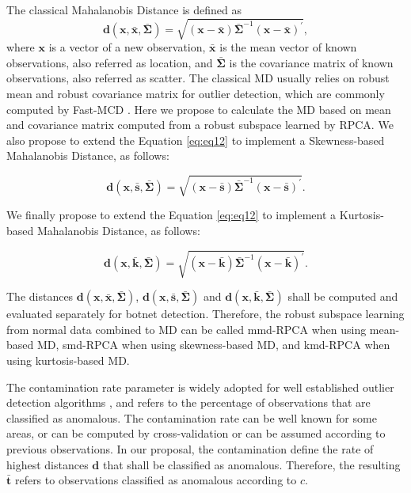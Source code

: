 \documentclass[review]{elsarticle}
\begin{document}
The classical Mahalanobis Distance is defined as		
\begin{equation}\label{eq:eq12}
	\boldsymbol{d}(\boldsymbol{x},\bar{\boldsymbol{x}}, \boldsymbol{\bar{\Sigma}}) = \sqrt{(\boldsymbol{x} - \bar{\boldsymbol{x}}) \boldsymbol{\bar{\Sigma}}^{-1}(\boldsymbol{x} - \bar{\boldsymbol{x}})^\prime},
\end{equation}
where $\boldsymbol{x}$ is a vector of a new observation, $\bar{\boldsymbol{x}}$ is the mean vector of known observations, also referred as location, and $\boldsymbol{\bar{\Sigma}}$ is the covariance matrix of known observations, also referred as scatter. The classical MD usually relies on robust mean and robust covariance matrix for outlier detection, which are commonly computed by Fast-MCD \cite{rousseeuw1984mcd, rousseeuw1999fastmcd}. Here we propose to calculate the MD based on mean and covariance matrix computed from a robust subspace learned by RPCA. We also propose to extend the Equation \ref{eq:eq12} to implement a Skewness-based Mahalanobis Distance, as follows:

\begin{equation}\label{eq:eq13}
	\boldsymbol{d}(\boldsymbol{x}, \bar{\boldsymbol{s}}, \boldsymbol{\bar{\Sigma}}) = \sqrt{(\boldsymbol{x} - \bar{\boldsymbol{s}}) \boldsymbol{\bar{\Sigma}}^{-1}(\boldsymbol{x} - \bar{\boldsymbol{s}})^\prime}.
\end{equation}

We finally propose to extend the Equation \ref{eq:eq12} to implement a Kurtosis-based Mahalanobis Distance, as follows:

\begin{equation}\label{eq:eq14}
	\boldsymbol{d}(\boldsymbol{x}, \bar{\boldsymbol{k}}, \boldsymbol{\bar{\Sigma}}) = \sqrt{(\boldsymbol{x} - \bar{\boldsymbol{k}}) \boldsymbol{\bar{\Sigma}}^{-1}(\boldsymbol{x} - \bar{\boldsymbol{k}})^\prime}.
\end{equation}

The distances $\boldsymbol{d}(\boldsymbol{x},\bar{\boldsymbol{x}}, \boldsymbol{\bar{\Sigma}})$, $\boldsymbol{d}(\boldsymbol{x}, \bar{\boldsymbol{s}}, \boldsymbol{\bar{\Sigma}})$ and $\boldsymbol{d}(\boldsymbol{x}, \bar{\boldsymbol{k}}, \boldsymbol{\bar{\Sigma}})$ shall be computed and evaluated separately for botnet detection. Therefore, the robust subspace learning from normal data combined to MD can be called mmd-RPCA when using mean-based MD, smd-RPCA when using skewness-based MD, and kmd-RPCA when using kurtosis-based MD.

The contamination rate parameter is widely adopted for well established outlier detection algorithms \cite{zhao2019pyod}, and refers to the percentage of observations that are classified as anomalous. The contamination rate can be well known for some areas, or can be computed by cross-validation or can be assumed according to previous observations. In our proposal, the contamination define the rate of highest distances $\boldsymbol{d}$ that shall be classified as anomalous. Therefore, the resulting $\boldsymbol{\bar{t}}$ refers to observations classified as anomalous according to $c$.
\end{document}
